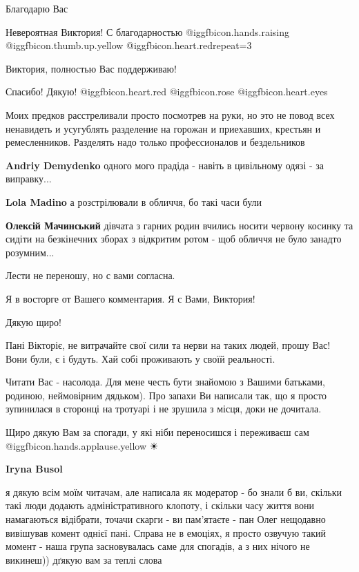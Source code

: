 \begin{itemize}
Благодарю Вас

Невероятная Виктория! С благодарностью  @igg{fbicon.hands.raising}  @igg{fbicon.thumb.up.yellow} @igg{fbicon.heart.red}{repeat=3}

Виктория, полностью Вас поддерживаю!

Спасибо! Дякую! @igg{fbicon.heart.red} @igg{fbicon.rose}  @igg{fbicon.heart.eyes} 


Моих предков расстреливали просто посмотрев на руки, но это не повод всех
ненавидеть и усугублять разделение на горожан и приехавших, крестьян и
ремесленников. Разделять надо только профессионалов и бездельников

\begin{itemize} %
\textbf{Andriy Demydenko} одного мого прадіда - навіть в цивільному одязі - за виправку...

\textbf{Lola Madino} а розстрілювали в обличчя, бо такі часи були

\textbf{Олексій Мачинський} дівчата з гарних родин вчились носити червону косинку та сидіти на безкінечних зборах з відкритим ротом - щоб обличчя не було занадто розумним...
\end{itemize} %

Лести не переношу, но с вами согласна.

Я в восторге от Вашего комментария. Я с Вами, Виктория!

Дякую щиро!


Пані Вікторіє, не витрачайте свої сили та нерви на таких людей, прошу Вас! Вони
були, є і будуть. Хай собі проживають у своїй реальності.

Читати Вас - насолода. Для мене честь бути знайомою з Вашими батьками, родиною,
неймовірним дядьком). Про запахи Ви написали так, що я просто зупинилася в
сторонці на тротуарі і не зрушила з місця, доки не дочитала.

Щиро дякую Вам за спогади, у які ніби переносишся і переживаєш сам  @igg{fbicon.hands.applause.yellow}  ☀ ️ 

\begin{itemize} %
\textbf{Iryna Busol} 

я дякую всім моїм читачам, але написала як модератор - бо знали б ви, скільки
такі люди додають адміністративного клопоту, і скільки часу життя вони
намагаються відібрати, точачи скарги - ви пам'ятаєте - пан Олег нещодавно
вивішував комент однієї пані. Справа не в емоціях, я просто озвучую такий
момент - наша група засновувалась саме для спогадів, а з них нічого не
викинеш)) дґякую вам за теплі слова


\end{itemize}
\end{itemize}
